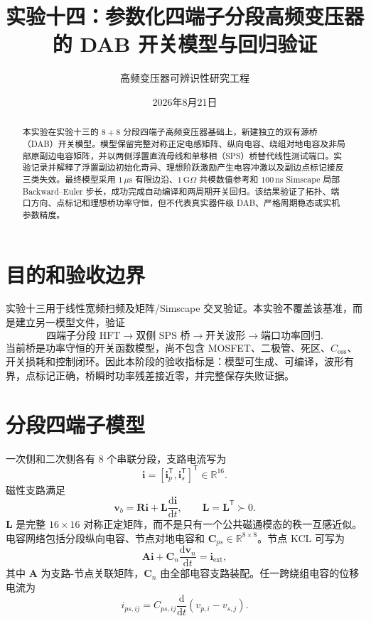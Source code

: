 \documentclass[11pt,a4paper]{ctexart}
\title{实验十四：参数化四端子分段高频变压器的 DAB 开关模型与回归验证}
\author{高频变压器可辨识性研究工程}
\date{2026年8月21日}
\begin{document}
\maketitle

\begin{abstract}
本实验在实验十三的 $8+8$ 分段四端子高频变压器基础上，新建独立的双有源桥（DAB）开关模型。模型保留完整对称正定电感矩阵、纵向电容、绕组对地电容及非局部原副边电容矩阵，并以两侧浮置直流母线和单移相（SPS）桥替代线性测试端口。实验记录并解释了浮置副边初始化奇异、理想阶跃激励产生电容冲激以及副边点标记接反三类失效。最终模型采用 $1\,\mu\mathrm{s}$ 有限边沿、$1\,\mathrm{G}\Omega$ 共模数值参考和 $100\,\mathrm{ns}$ Simscape 局部 Backward--Euler 步长，成功完成自动编译和两周期开关回归。该结果验证了拓扑、端口方向、点标记和理想桥功率守恒，但不代表真实器件级 DAB、严格周期稳态或实机参数精度。
\end{abstract}

\section{目的和验收边界}
实验十三用于线性宽频扫频及矩阵/Simscape 交叉验证。本实验不覆盖该基准，而是建立另一模型文件，验证
\[
\text{四端子分段 HFT}\to\text{双侧 SPS 桥}\to
\text{开关波形}\to\text{端口功率回归}.
\]
当前桥是功率守恒的开关函数模型，尚不包含 MOSFET、二极管、死区、$C_{\mathrm{oss}}$、开关损耗和控制闭环。因此本阶段的验收指标是：模型可生成、可编译，波形有界，点标记正确，桥瞬时功率残差接近零，并完整保存失败证据。

\section{分段四端子模型}
一次侧和二次侧各有 8 个串联分段，支路电流写为
\[
\bm i=[\bm i_p^{\mathsf T},\bm i_s^{\mathsf T}]^{\mathsf T}\in\mathbb R^{16}.
\]
磁性支路满足
\begin{equation}
\bm v_b=\bm R\bm i+\bm L\frac{\mathrm d\bm i}{\mathrm dt},
\qquad \bm L=\bm L^{\mathsf T}\succ0 .
\label{eq:rl}
\end{equation}
$\bm L$ 是完整 $16\times16$ 对称正定矩阵，而不是只有一个公共磁通模态的秩一互感近似。电容网络包括分段纵向电容、节点对地电容和 $\bm C_{ps}\in\mathbb R^{8\times8}$。节点 KCL 可写为
\begin{equation}
\bm A\bm i+\bm C_n\frac{\mathrm d\bm v_n}{\mathrm dt}=\bm i_{\mathrm{ext}},
\end{equation}
其中 $\bm A$ 为支路-节点关联矩阵，$\bm C_n$ 由全部电容支路装配。任一跨绕组电容的位移电流为
\begin{equation}
i_{ps,ij}=C_{ps,ij}\frac{\mathrm d}{\mathrm dt}(v_{p,i}-v_{s,j}).
\end{equation}
\end{document}
